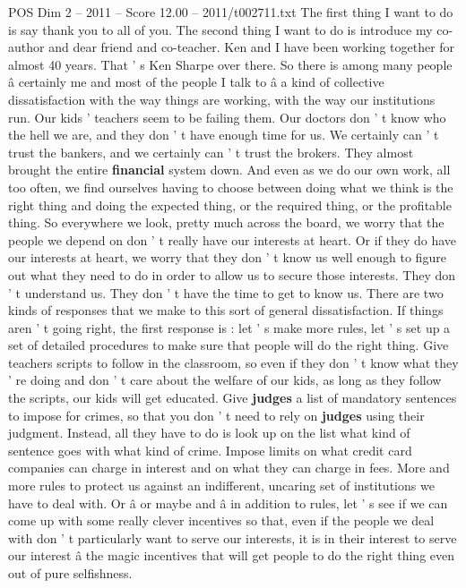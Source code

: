 \begin{textsample}{POS Dim 2 – 2011 – Score 12.00 – 2011/t002711.txt}  \label{ex:f2_pos_082}
The first thing I want to do is say thank you to all of you.
The second thing I want to do is introduce my co-author and dear friend and co-teacher.
Ken and I have been working together for almost 40 years.
That ' s Ken Sharpe over there.
So there is among many people â certainly me and most of the people I talk to â a kind of collective dissatisfaction with the way things are working, with the way our institutions run.
Our kids ' teachers seem to be failing them.
Our doctors don ' t know who the hell we are, and they don ' t have enough time for us.
We certainly can ' t trust the bankers, and we certainly can ' t trust the brokers.
They almost brought the entire \textbf{financial} system down.
And even as we do our own work, all too often, we find ourselves having to choose between doing what we think is the right thing and doing the expected thing, or the required thing, or the profitable thing.
So everywhere we look, pretty much across the board, we worry that the people we depend on don ' t really have our interests at heart.
Or if they do have our interests at heart, we worry that they don ' t know us well enough to figure out what they need to do in order to allow us to secure those interests.
They don ' t understand us.
They don ' t have the time to get to know us.
There are two kinds of responses that we make to this sort of general dissatisfaction.
If things aren ' t going right, the first response is : let ' s make more rules, let ' s set up a set of detailed procedures to make sure that people will do the right thing.
Give teachers scripts to follow in the classroom, so even if they don ' t know what they ' re doing and don ' t care about the welfare of our kids, as long as they follow the scripts, our kids will get educated.
Give \textbf{judges} a list of mandatory sentences to impose for crimes, so that you don ' t need to rely on \textbf{judges} using their judgment.
Instead, all they have to do is look up on the list what kind of sentence goes with what kind of crime.
Impose limits on what credit card companies can charge in interest and on what they can charge in fees.
More and more rules to protect us against an indifferent, uncaring set of institutions we have to deal with.
Or â or maybe and â in addition to rules, let ' s see if we can come up with some really clever incentives so that, even if the people we deal with don ' t particularly want to serve our interests, it is in their interest to serve our interest â the magic incentives that will get people to do the right thing even out of pure selfishness.

\end{textsample}
